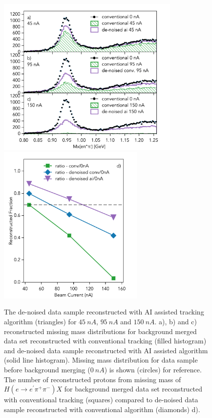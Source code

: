 \begin{figure}[!h]
\begin{center}
 \includegraphics[height=3.1in]{images/plots_mxepipi_dn_ai_ns.pdf}
 \includegraphics[height=3.1in]{images/graph_mxepipi_dn_ai_ns.pdf}
\caption { 
The de-noised data sample reconstructed with AI assisted tracking 
algorithm (triangles)  for $45~nA$, $95~nA$ and $150~nA$. a), b) and c) reconstructed missing mass distributions for 
background merged data set reconstructed with conventional tracking (filled histogram) and de-noised data sample 
reconstructed with AI assisted algorithm (solid line histogram). Missing mass distribution for data sample before 
background merging ($0~nA$) is shown (circles) for reference.
The number of reconstructed protons from missing mass of $H(e \rightarrow e^\prime \pi^+ \pi^-) X$ 
for background merged data set reconstructed with conventional tracking (squares) compared to de-noised data sample 
reconstructed with conventional algorithm (diamonds) d). }

 \label{physics::conv_dn_ai}
 \end{center}
\end{figure}

